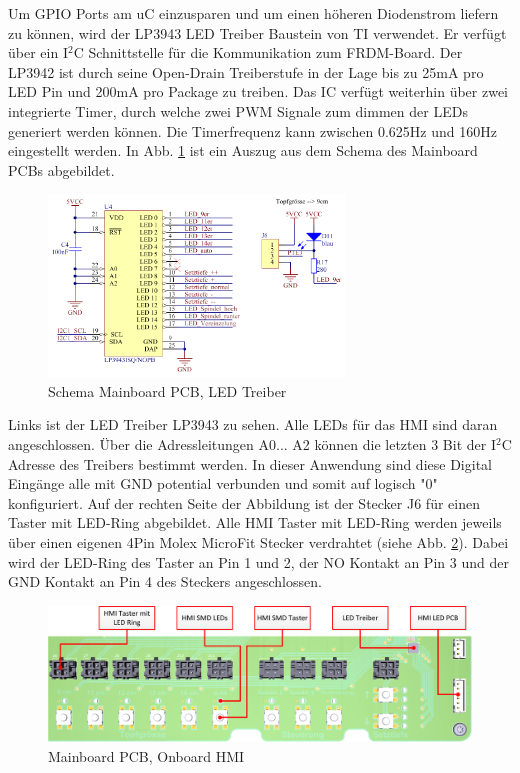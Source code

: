 Um GPIO Ports am uC einzusparen und um einen höheren Diodenstrom liefern zu können, wird der LP3943 LED Treiber Baustein von TI verwendet. Er verfügt über ein I$^{2}$C Schnittstelle für die Kommunikation zum FRDM-Board. Der LP3942 ist durch seine Open-Drain Treiberstufe in der Lage bis zu 25mA pro LED Pin und 200mA pro Package zu treiben. Das IC verfügt weiterhin über zwei integrierte Timer, durch welche zwei PWM Signale zum dimmen der LEDs generiert werden können. Die Timerfrequenz kann zwischen 0.625Hz und 160Hz eingestellt werden. In Abb. \ref{fig:Mainboard_LED_Driver_LP3943} ist ein Auszug aus dem Schema des Mainboard PCBs abgebildet. 

\begin{figure}[H]
	\includegraphics[width=0.7\textwidth]{Illustrationen/6-Umsetzung/Schema_Mainboard_LP39431.png}
	\caption{Schema Mainboard PCB, LED Treiber}
	\label{fig:Mainboard_LED_Driver_LP3943}
\end{figure}

Links ist der LED Treiber LP3943 zu sehen. Alle LEDs für das HMI sind daran angeschlossen. Über die Adressleitungen A0... A2 können die letzten 3 Bit der I$^{2}$C Adresse des Treibers bestimmt werden. In dieser Anwendung sind diese Digital Eingänge alle mit GND potential verbunden und somit auf logisch "0" konfiguriert. Auf der rechten Seite der Abbildung ist der Stecker J6 für einen Taster mit LED-Ring abgebildet. Alle HMI Taster mit LED-Ring werden jeweils über einen eigenen 4Pin Molex MicroFit Stecker verdrahtet (siehe Abb. \ref{fig:Mainboard_HMI_Layout}). Dabei wird der LED-Ring des Taster an Pin 1 und 2, der NO Kontakt an Pin 3 und der GND Kontakt an Pin 4 des Steckers angeschlossen.

\begin{figure}[H]
	\includegraphics[width=1\textwidth]{Illustrationen/6-Umsetzung/HMI_Layout.jpg}
	\caption{Mainboard PCB, Onboard HMI}
	\label{fig:Mainboard_HMI_Layout}
\end{figure}

